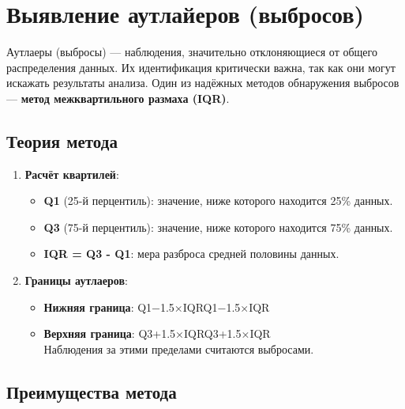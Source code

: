 \documentclass[
  letterpaper,
  DIV=11,
  numbers=noendperiod]{scrreprt}
\begin{document}
\section{Выявление аутлайеров
(выбросов)}\label{ux432ux44bux44fux432ux43bux435ux43dux438ux435-ux430ux443ux442ux43bux430ux439ux435ux440ux43eux432-ux432ux44bux431ux440ux43eux441ux43eux432}

Аутлаеры (выбросы) --- наблюдения, значительно отклоняющиеся от общего
распределения данных. Их идентификация критически важна, так как они
могут искажать результаты анализа. Один из надёжных методов обнаружения
выбросов --- \textbf{метод межквартильного размаха (IQR)}.

\subsection{\texorpdfstring{\textbf{Теория
метода}}{Теория метода}}\label{ux442ux435ux43eux440ux438ux44f-ux43cux435ux442ux43eux434ux430}

\begin{enumerate}
\def\labelenumi{\arabic{enumi}.}
\item
  \textbf{Расчёт квартилей}:

  \begin{itemize}
  \item
    \textbf{Q1} (25-й перцентиль): значение, ниже которого находится
    25\% данных.
  \item
    \textbf{Q3} (75-й перцентиль): значение, ниже которого находится
    75\% данных.
  \item
    \textbf{IQR = Q3 - Q1}: мера разброса средней половины данных.
  \end{itemize}
\item
  \textbf{Границы аутлаеров}:

  \begin{itemize}
  \item
    \textbf{Нижняя граница}: Q1−1.5×IQRQ1−1.5×IQR
  \item
    \textbf{Верхняя граница}: Q3+1.5×IQRQ3+1.5×IQR\\
    Наблюдения за этими пределами считаются выбросами.
  \end{itemize}
\end{enumerate}

\subsection{\texorpdfstring{\textbf{Преимущества
метода}}{Преимущества метода}}\label{ux43fux440ux435ux438ux43cux443ux449ux435ux441ux442ux432ux430-ux43cux435ux442ux43eux434ux430}
\end{document}
